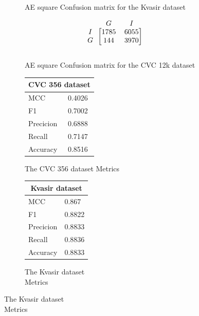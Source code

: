 \begin{figure}[h]
\begin{subfigure}[b]{0.49\textwidth}
        
\caption{AE square Confusion matrix for the Kvasir dataset}
\label{mat:kvasir_CM_IRV2_AE_SQUARE}
\end{subfigure}
\begin{subfigure}[b]{0.25\textwidth}
        \[
\begin{blockarray}{ccc}
& G & I  \\
\begin{block}{c[cc]}
 		I&1785 & 6055\\
        G&144  & 3970\\
\end{block}
\end{blockarray}
\]   
\caption{AE square Confusion matrix for the CVC 12k dataset}
\label{mat:cvc12k_CM_IRV2_AE_SQUARE}
\end{subfigure}
\caption{Confusion matrices for the three datasets}
\label{mat:CM_IRV2_AE_SQUARE}
\begin{subfigure}[b]{0.25\textwidth}
\begin{tabular}{ll}      
        \toprule
        \multicolumn{2}{c}{CVC 356 dataset}        \\
        \midrule
        MCC 		& 0.4026 \\
        F1  		& 0.7002 \\
        Precicion  	& 0.6888 \\
        Recall     	& 0.7147 \\
        Accuracy	& 0.8516 \\
        \bottomrule
        \end{tabular}
\caption{The CVC 356 dataset Metrics}
\label{tab:cvc356_metrics_IRV2_AE_SQUARE}
\end{subfigure}%
\begin{subfigure}[b]{0.49\textwidth}
    	\centering
        \begin{tabular}{ll}
        \toprule
        \multicolumn{2}{c}{Kvasir dataset}        \\
        \midrule
        MCC 		& 0.867  \\
        F1  		& 0.8822 \\
        Precicion  	& 0.8833 \\
        Recall     	& 0.8836 \\
        Accuracy	& 0.8833 \\
        \bottomrule
\end{tabular}
\caption{The Kvasir dataset\\ Metrics}
\label{tab:kvasir_metrics_IRV2_AE_SQUARE}
\end{subfigure}%

\end{figure}
